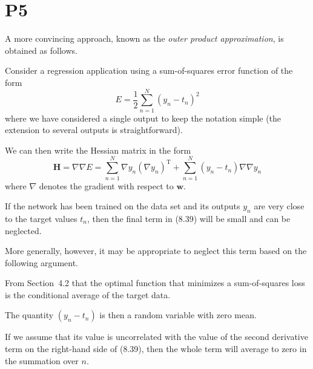 \documentclass{article}
\begin{document}
\section{P5}

A more convincing approach, known as the \textit{outer product approximation}, is obtained as follows. 

Consider a regression application using a sum-of-squares error function of the form
\begin{equation}
    E = \frac{1}{2} \sum_{n=1}^N (y_n - t_n)^2
    \tag{8.38}
\end{equation}
where we have considered a single output to keep the notation simple (the extension to several outputs is straightforward). 

We can then write the Hessian matrix in the form
\begin{equation}
    \mathbf{H} = \nabla \nabla E = \sum_{n=1}^N \nabla y_n (\nabla y_n)^\mathrm{T} + \sum_{n=1}^N (y_n - t_n) \nabla \nabla y_n
    \tag{8.39}
\end{equation}
where $\nabla$ denotes the gradient with respect to $\mathbf{w}$. 

If the network has been trained on the data set and its outputs $y_n$ are very close to the target values $t_n$, then the final term in (8.39) will be small and can be neglected. 

More generally, however, it may be appropriate to neglect this term based on the following argument. 

From Section~4.2 that the optimal function that minimizes a sum-of-squares loss is the conditional average of the target data. 

The quantity $(y_n - t_n)$ is then a random variable with zero mean. 

If we assume that its value is uncorrelated with the value of the second derivative term on the right-hand side of (8.39), then the whole term will average to zero in the summation over $n$.

\end{document}
